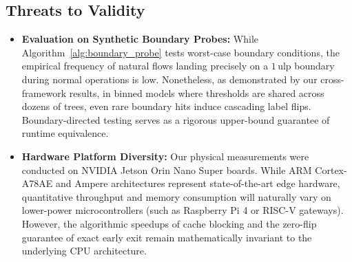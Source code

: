 \subsection{Threats to Validity}
\begin{itemize}
    \item \textbf{Evaluation on Synthetic Boundary Probes:} While Algorithm~\ref{alg:boundary_probe} tests worst-case boundary conditions, the empirical frequency of natural flows landing precisely on a $1\,\text{ulp}$ boundary during normal operations is low. Nonetheless, as demonstrated by our cross-framework results, in binned models where thresholds are shared across dozens of trees, even rare boundary hits induce cascading label flips. Boundary-directed testing serves as a rigorous upper-bound guarantee of runtime equivalence.
    \item \textbf{Hardware Platform Diversity:} Our physical measurements were conducted on NVIDIA Jetson Orin Nano Super boards. While ARM Cortex-A78AE and Ampere architectures represent state-of-the-art edge hardware, quantitative throughput and memory consumption will naturally vary on lower-power microcontrollers (such as Raspberry Pi 4 or RISC-V gateways). However, the algorithmic speedups of cache blocking and the zero-flip guarantee of exact early exit remain mathematically invariant to the underlying CPU architecture.
\end{itemize}
